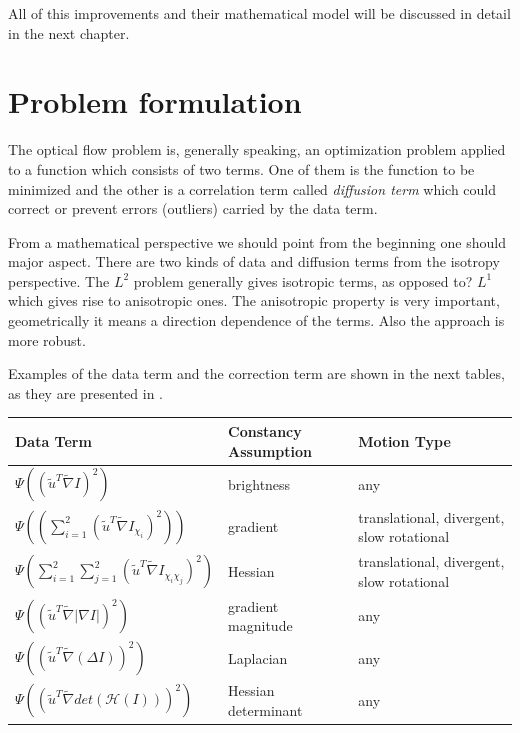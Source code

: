 \documentclass[12pt,a4paper,twoside]{report}
\begin{document}
All of this improvements and their mathematical model will be discussed in detail in the next chapter.   

\section{Problem formulation}
The optical flow problem is, generally speaking, an optimization problem applied to a function which consists of two terms. One of them is the function to be minimized and the other is a correlation term called \textit{diffusion term} which could correct or prevent errors (outliers) carried by the data term. 

From a mathematical perspective we should point from the beginning one should major aspect. There are two kinds of data and diffusion terms from the isotropy perspective. The $L^2$ problem generally gives isotropic terms, as opposed to? $L^1$ which gives rise to anisotropic ones. The anisotropic property is very important, geometrically it means a direction dependence of the terms. Also the approach is more robust.

Examples of the data term and the correction term are shown in the next tables,  as they are presented in \cite{trobin}.

\begin{center}
	\begin{tabular}{  | l | l | p{5cm} |}
		\hline
		Data Term & Constancy Assumption & Motion Type \\ \hline
		$\Psi \left((\tilde{u}^T\tilde{\nabla}I)^2\right)$ & brightness & any \\ \hline
		
		$\Psi \left((\sum_{i=1}^{2}{(\tilde{u}^T\tilde{\nabla}I_{\chi_i})^2})\right)$ & gradient & translational,
		divergent,
		slow rotational \\ \hline
		
		$\Psi{\left(\sum_{i=1}^{2}\sum_{j=1}^{2}\left(\tilde{u}^T\tilde{\nabla}I_{\chi_i\chi_j}\right)^2\right)}$ & Hessian & translational,
		divergent,
		slow rotational \\
		\hline
		
		$\Psi \left( \left( \tilde{u}^T \tilde{\nabla} |\nabla I| \right)^2 \right)$ & gradient magnitude & any \\
		\hline
		
		$\Psi\left( \left( \tilde{u}^T\tilde{\nabla} \left( \Delta I \right) \right)^2 \right)$ & Laplacian & any \\
		\hline
		
		$\Psi \left( \left( \tilde{u}^T \tilde{\nabla} det \left( \mathcal{H} \left( I \right) \right) \right)^2 \right) $ & Hessian determinant & any \\
		\hline
	\end{tabular}
\end{center}
\end{document}
